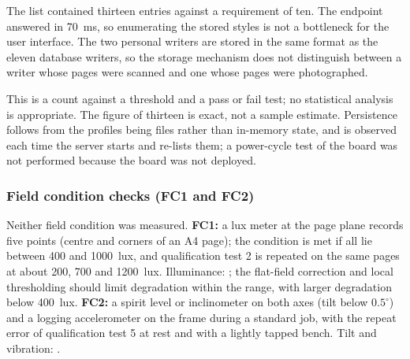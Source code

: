             The list contained thirteen entries against a requirement of ten.
            The endpoint answered in 70~ms, so enumerating the stored styles is not a bottleneck for the user interface.
            The two personal writers are stored in the same format as the eleven database writers, so the storage mechanism does not distinguish between a writer whose pages were scanned and one whose pages were photographed.


            This is a count against a threshold and a pass or fail test; no statistical analysis is appropriate.
            The figure of thirteen is exact, not a sample estimate.
            Persistence follows from the profiles being files rather than in-memory state, and is observed each time the server starts and re-lists them; a power-cycle test of the board was not performed because the board was not deployed.



\subsubsection*{Field condition checks (FC1 and FC2)}
\label{sec:res-fc}

Neither field condition was measured.
\textbf{FC1:} a lux meter at the page plane records five points (centre and corners of an A4 page); the condition is met if all lie between 400 and 1000~lux, and qualification test 2 is repeated on the same pages at about 200, 700 and 1200~lux.
Illuminance: \nym{}; the flat-field correction and local thresholding should limit degradation within the range, with larger degradation below 400~lux.
\textbf{FC2:} a spirit level or inclinometer on both axes (tilt below $0.5^\circ$) and a logging accelerometer on the frame during a standard job, with the repeat error of qualification test 5 at rest and with a lightly tapped bench.
Tilt and vibration: \nym{}.

